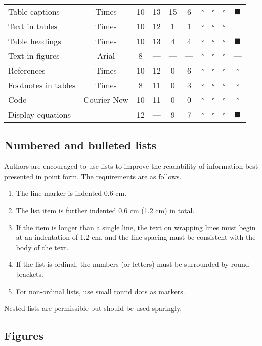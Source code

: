 \documentclass{ledger}
\begin{document}
\begin{table}[ht]
\begin{tabularx}{\textwidth}{ l  c  c  C  C  C  c  c  c  c }
Table captions & Times & 10 & 13 & 15 & 6 & $\square$ & $\square$ & $\square$ & $\blacksquare$ \\
Text in tables & Times & 10 & 12 & 1 & 1 & $\square$ & $\square$ & $\square$ & --- \\
Table headings & Times & 10 & 13 & 4 & 4 & $\square$ & $\square$ & $\square$ & $\blacksquare$ \\
Text in figures & Arial & 8 & --- & --- & --- & $\square$ & $\square$ & $\square$ & --- \\
References & Times & 10 & 12 & 0 & 6 & $\square$ & $\square$ & $\square$ & $\square$  \\
Footnotes in tables & Times & 8 & 11 & 0 & 3 & $\square$ & $\square$ & $\square$ & $\square$ \\
Code & Courier New & 10 & 11 & 0 & 0 & $\square$ & $\square$ & $\square$ & $\square$ \\
Display equations &  & 12 & --- & 9 & 7 & $\square$ & $\square$ & $\square$ & $\blacksquare$ \\ \hline
\end{tabularx}
\end{table}

\subsection{Numbered and bulleted lists}

Authors are encouraged to use lists to improve the readability of information best presented in point form.  The requirements are as follows.
\begin{enumerate}
\item The line marker is indented 0.6 cm.
\item The list item is further indented 0.6 cm (1.2 cm) in total.
\item If the item is longer than a single line, the text on wrapping lines must begin at an indentation of 1.2 cm, and the line spacing must be consistent with the body of the text.
\item If the list is ordinal, the numbers (or letters) must be surrounded by round brackets.
\item For non-ordinal lists, use small round dots as markers.
\end{enumerate}
Nested lists are permissible but should be used sparingly.

\subsection{Figures}
\end{document}
